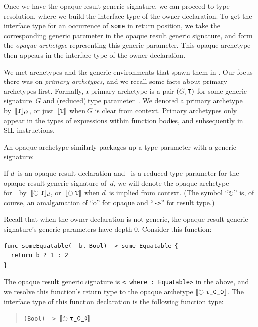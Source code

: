 \documentclass[../generics]{subfiles}
\begin{document}
Once we have the opaque result generic signature, we can proceed to type resolution, where we build the interface type of the owner declaration. To get the interface type for an occurrence of \texttt{some} in return position, we take the corresponding generic parameter in the opaque result generic signature, and form the \emph{opaque archetype} representing this generic parameter. This opaque archetype then appears in the interface type of the owner declaration.

We met archetypes and the generic environments that spawn them in . Our focus there was on \emph{primary archetypes}, and we recall some facts about primary archetypes first. Formally, a primary archetype is a pair $(G, \texttt{T})$ for some generic signature~$G$ and (reduced) type parameter~\tT. We denoted a primary archetype by~$[\![\texttt{T}]\!]_G$, or just~$[\![\texttt{T}]\!]$ when $G$ is clear from context. Primary archetypes only appear in the types of expressions within function bodies, and subsequently in SIL instructions.

An opaque archetype similarly packages up a type parameter with a generic signature:

\begin{definition}
If $d$~is an opaque result declaration and \tT~is a reduced type parameter for the opaque result generic signature of~$d$, we will denote the opaque archetype for~\tT\ by~$[\![\circlearrowright \texttt{\texttt{T}}]\!]_d$, or~$\Ot$ when $d$~is implied from context. (The symbol \index{$\Ot$}
``$\circlearrowright$'' is, of course, an amalgamation of ``o'' for opaque and  ``\texttt{->}'' for result type.)
\end{definition}

\begin{example}\label{some equatable example}
Recall that when the owner declaration is not generic, the opaque result generic signature's generic parameters have depth 0. Consider this function:
\begin{Verbatim}
func someEquatable(_ b: Bool) -> some Equatable {
  return b ? 1 : 2
}
\end{Verbatim}
The opaque result generic signature is \texttt{<\rT\ where \rT:\ Equatable>} in the above, and we resolve this function's return type to the opaque archetype $\Ox$. The interface type of this function declaration is the following function type:
\begin{quote}
\texttt{(Bool) -> $\Ox$}
\end{quote}
\end{example}
\end{document}
